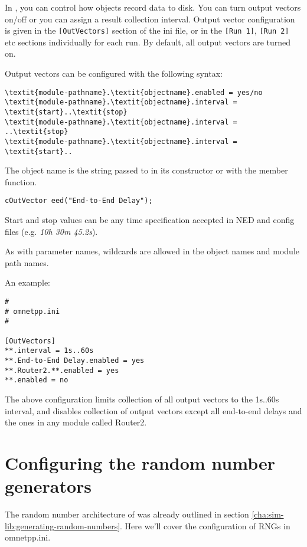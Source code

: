 In {\opp}, you can control how  objects record data
to disk. You can turn output vectors on/off or you can assign a result
collection interval. Output vector configuration is given in the
\texttt{[OutVectors]} section of the ini file, or in the \texttt{[Run
  1]}, \texttt{[Run 2]} etc sections individually for each run. By
default, all output vectors are turned on.

Output vectors can be configured with the following syntax:

\begin{Verbatim}[commandchars=\\\{\}]
\textit{module-pathname}.\textit{objectname}.enabled = yes/no
\textit{module-pathname}.\textit{objectname}.interval = \textit{start}..\textit{stop}
\textit{module-pathname}.\textit{objectname}.interval = ..\textit{stop}
\textit{module-pathname}.\textit{objectname}.interval = \textit{start}..
\end{Verbatim}

The object name is the string passed to  in its constructor
or with the  member function.

\begin{verbatim}
cOutVector eed("End-to-End Delay");
\end{verbatim}

Start and stop values can be any time specification accepted
in NED and config files (e.g. \textit{10h 30m 45.2s}).

As with parameter names, wildcards are allowed in the object
names and module path names.

An example:

\begin{verbatim}
#
# omnetpp.ini
#

[OutVectors]
**.interval = 1s..60s
**.End-to-End Delay.enabled = yes
**.Router2.**.enabled = yes
**.enabled = no
\end{verbatim}


The above configuration limits collection of all output vectors
to the 1s..60s interval, and disables collection of output vectors
except all end-to-end delays and the ones in any module called Router2.


\section{Configuring the random number generators}
\label{sec:ch-run-sim:rng-config}

The random number architecture of {\opp} was already outlined
in section \ref{cha:sim-lib:generating-random-numbers}. Here
we'll cover the configuration of RNGs in omnetpp.ini.

